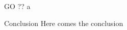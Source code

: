 \documentclass[table]{beamer}\usepackage[]{graphicx}\usepackage[]{color}
\begin{document}
% 
% 
% 


\begin{frame}[fragile]{GO ??}
a
\end{frame}


\begin{frame}[fragile]{Conclusion}
Here comes the conclusion
\end{frame}
\end{document}
